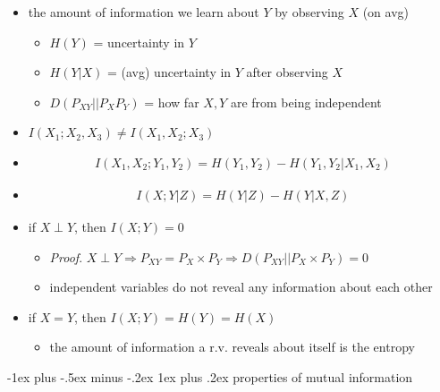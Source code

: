 \documentclass[10pt, landscape]{article}
\makeatletter
\renewcommand{\subsubsection}{\@startsection{subsubsection}{3}{0mm}%
  {-1ex plus -.5ex minus -.2ex}%
  {1ex plus .2ex}%
{\normalfont\small\bfseries}}%
\makeatother
\begin{document}
\begin{multicols*}{4}
\begin{itemize}
    \item {} the amount of information we learn about $Y$ by observing $X$ (on avg)
      \begin{itemize}
        \item $H(Y)$ = uncertainty in  $Y$ 
        \item $H(Y \vert X)$ = (avg) uncertainty in $Y$ after observing $X$
        \item $D(P_{XY}\vert\vert P_X P_Y)$ = how far $X,Y$ are from being independent
      \end{itemize}
    \item $I(X_1;X_2,X_3) \neq I(X_1, X_2;X_3)$ 
    \item {} 
      \begin{align*}
        I(X_1, X_2 ; Y_1, Y_2) = H(Y_1, Y_2) - H(Y_1, Y_2 \vert X_1, X_2)
      \end{align*}
    \item {} 
      \begin{align*}
        I(X;Y \vert Z) = H(Y \vert Z) - H(Y \vert X,Z)
      \end{align*}
    \item if $X \perp Y$, then $I(X;Y) = 0$ 
      \begin{itemize}
        \item \textit{Proof}. $X \perp Y \Rightarrow P_{XY} = P_X \times P_Y \Rightarrow D(P_{XY} \vert \vert P_X \times P_Y) = 0$
        \item independent variables do not reveal any information about each other
      \end{itemize}
    \item if  $X=Y$, then $I(X;Y) = H(Y) = H(X)$
      \begin{itemize}
        \item the amount of information a r.v. reveals about itself is the entropy
      \end{itemize}
  \end{itemize}

  \subsubsection{properties of mutual information}


\end{multicols*}
\end{document}

